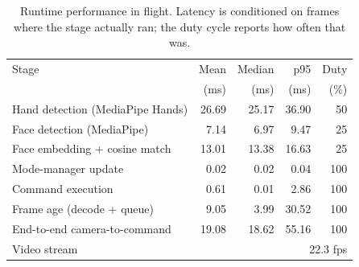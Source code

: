 \begin{table}[t]
\caption{Runtime performance in flight. Latency is conditioned on frames where the stage actually ran; the duty cycle reports how often that was.}
\label{tab:runtime}
\centering
\begin{tabular}{lrrrr}
\toprule
Stage & Mean & Median & p95 & Duty \\
& (ms) & (ms) & (ms) & (\%) \\
\midrule
Hand detection (MediaPipe Hands) & 26.69 & 25.17 & 36.90 & 50 \\
Face detection (MediaPipe) & 7.14 & 6.97 & 9.47 & 25 \\
Face embedding + cosine match & 13.01 & 13.38 & 16.63 & 25 \\
Mode-manager update & 0.02 & 0.02 & 0.04 & 100 \\
Command execution & 0.61 & 0.01 & 2.86 & 100 \\
Frame age (decode + queue) & 9.05 & 3.99 & 30.52 & 100 \\
End-to-end camera-to-command & 19.08 & 18.62 & 55.16 & 100 \\
\midrule
Video stream & \multicolumn{4}{r}{22.3 fps} \\
\bottomrule
\end{tabular}
\end{table}
